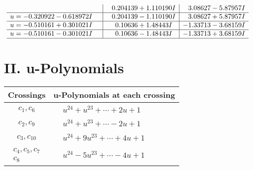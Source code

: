 \documentclass[1p]{elsarticle_modified}
\theoremstyle{definition}
\begin{document}
$$\begin{array}{c|c|c}
 & \phantom{-}0.204139 + 1.110190 I & \phantom{-}3.08627 - 5.87957 I \\ \hline\begin{aligned}
u &= -0.320922 - 0.618972 I\end{aligned}
 & \phantom{-}0.204139 - 1.110190 I & \phantom{-}3.08627 + 5.87957 I \\ \hline\begin{aligned}
u &= -0.510161 + 0.301021 I\end{aligned}
 & \phantom{-}0.10636 + 1.48443 I & -1.33713 - 3.68159 I \\ \hline\begin{aligned}
u &= -0.510161 - 0.301021 I\end{aligned}
 & \phantom{-}0.10636 - 1.48443 I & -1.33713 + 3.68159 I\\
 \hline 
 \end{array}$$\newpage
\newpage\renewcommand{\arraystretch}{1}
\centering \section*{ II. u-Polynomials}
\begin{tabular}{m{50pt}|m{274pt}}
Crossings & \hspace{64pt}u-Polynomials at each crossing \\
\hline $$\begin{aligned}c_{1},c_{6}\end{aligned}$$&$\begin{aligned}
&u^{24}+u^{23}+\cdots+2 u+1
\end{aligned}$\\
\hline $$\begin{aligned}c_{2},c_{9}\end{aligned}$$&$\begin{aligned}
&u^{24}+u^{23}+\cdots-2 u+1
\end{aligned}$\\
\hline $$\begin{aligned}c_{3},c_{10}\end{aligned}$$&$\begin{aligned}
&u^{24}+9 u^{23}+\cdots+4 u+1
\end{aligned}$\\
\hline $$\begin{aligned}c_{4},c_{5},c_{7}\\c_{8}\end{aligned}$$&$\begin{aligned}
&u^{24}-5 u^{23}+\cdots-4 u+1
\end{aligned}$\\
\hline
\end{tabular}\newpage\renewcommand{\arraystretch}{1}
\end{document}
